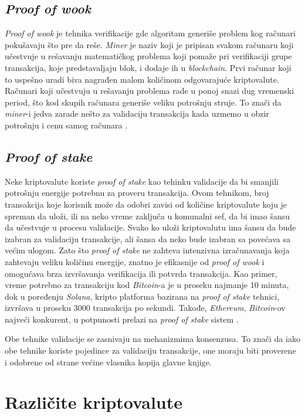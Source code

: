 \documentclass[a4paper]{article}
\begin{document}
{\subsection{\emph{Proof of wook}}
\label{subsec:work}
\emph{Proof of wook} je tehnika verifikacije gde algoritam generiše problem kog računari pokušavaju što pre da reše.
\emph{Miner} je naziv koji je pripisan svakom računaru koji učestvuje u rešavanju matematičkog problema koji pomaže pri verifikaciji grupe transakcija, koje predstavaljaju blok, i dodaje ih u  \emph{blockchain}. Prvi računar koji to uspešno uradi biva nagrađen malom količinom odgovarajuće kriptovalute.
Računari koji učestvuju u rešavanju problema rade u ponoj snazi dug vremenski period, što kod skupih računara generiše veliku potrošnju struje. To znači da  \emph{miner}-i jedva zarade nešto za validaciju transakcija kada uzmemo u obzir potrošnju i cenu samog računara \cite{kriptovalute2}.

\subsection{\emph{Proof of stake}}
\label{subsec:stake}
Neke kriptovalute koriste \emph{proof of stake} kao tehinku validacije da bi smanjili potrošnju energije potrebnu za proveru transakcija. Ovom tehnikom, broj transakcija koje korisnik može da odobri zavisi od količine kriptovalute koju je spreman da uloži, ili na neko vreme zaključa u komunalni sef, da bi imao šansu da učestvuje u procesu validacije.
Svako ko uloži kriptovalutu ima šansu da bude izabran za validaciju transakcije, ali šansa da neko bude izabran sa povećava sa većim ulogom.
Zato što \emph{proof of stake} ne zahteva intenzivna izračunavanja koja zahtevaju veliku količinu energije, znatno je efikasnije od \emph{proof of wook} i omogućava brza izvršavanja verifikacija ili potvrda transakcija.
Kao primer, vreme potrebno za transakciju kod \emph{Bitcoin}-a je u proseku najmanje 10 minuta, dok u poređenju \emph{Solana}, kripto platforma bazirana na \emph{proof of stake} tehnici, izvršava u proseku 3000 transakcija po sekundi.
Takođe, \emph{Ethereum}, \emph{Bitcoin}-ov najveći konkurent, u potpunosti prelazi na \emph{proof of stake} sistem \cite{kriptovalute2}.

Obe tehnike validacije se zasnivaju na mehanizmima konsenzusa. To znači da iako obe tehnike koriste pojedince za validaciju transakcije, one moraju biti proverene i odobrene od strane većine vlasnika kopija glavne knjige.\cite{kriptovalute2}


\section{Različite kriptovalute}
\label{sec:različitekriptovalute}

}
\end{document}
